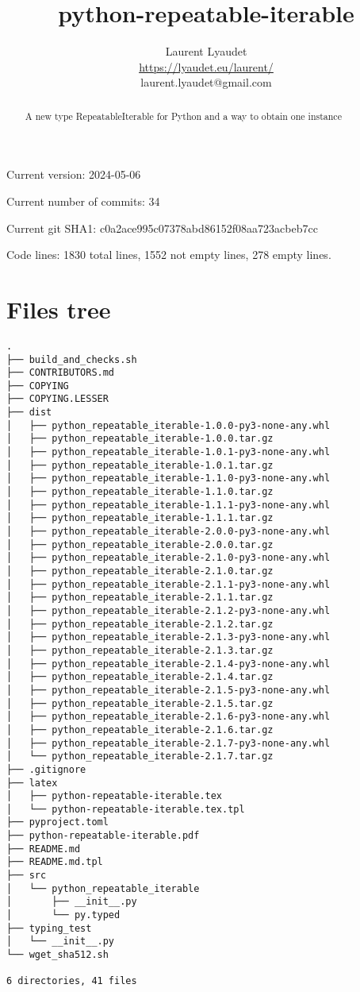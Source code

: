 \documentclass{article}
\begin{document}
\author{
  Laurent Lyaudet\\
  \url{https://lyaudet.eu/laurent/}\\
  laurent.lyaudet@gmail.com
}
\title{python-repeatable-iterable}

\maketitle
\begin{abstract}
A new type RepeatableIterable for Python
and a way to obtain one instance
\end{abstract}

Current version: 2024-05-06

Current number of commits: 34

Current git SHA1: c0a2ace995c07378abd86152f08aa723acbeb7cc

Code lines: 1830 total lines, 1552 not empty lines, 278 empty lines.

\section{Files tree}
\label{section:tree}

\begin{verbatim}
.
├── build_and_checks.sh
├── CONTRIBUTORS.md
├── COPYING
├── COPYING.LESSER
├── dist
│   ├── python_repeatable_iterable-1.0.0-py3-none-any.whl
│   ├── python_repeatable_iterable-1.0.0.tar.gz
│   ├── python_repeatable_iterable-1.0.1-py3-none-any.whl
│   ├── python_repeatable_iterable-1.0.1.tar.gz
│   ├── python_repeatable_iterable-1.1.0-py3-none-any.whl
│   ├── python_repeatable_iterable-1.1.0.tar.gz
│   ├── python_repeatable_iterable-1.1.1-py3-none-any.whl
│   ├── python_repeatable_iterable-1.1.1.tar.gz
│   ├── python_repeatable_iterable-2.0.0-py3-none-any.whl
│   ├── python_repeatable_iterable-2.0.0.tar.gz
│   ├── python_repeatable_iterable-2.1.0-py3-none-any.whl
│   ├── python_repeatable_iterable-2.1.0.tar.gz
│   ├── python_repeatable_iterable-2.1.1-py3-none-any.whl
│   ├── python_repeatable_iterable-2.1.1.tar.gz
│   ├── python_repeatable_iterable-2.1.2-py3-none-any.whl
│   ├── python_repeatable_iterable-2.1.2.tar.gz
│   ├── python_repeatable_iterable-2.1.3-py3-none-any.whl
│   ├── python_repeatable_iterable-2.1.3.tar.gz
│   ├── python_repeatable_iterable-2.1.4-py3-none-any.whl
│   ├── python_repeatable_iterable-2.1.4.tar.gz
│   ├── python_repeatable_iterable-2.1.5-py3-none-any.whl
│   ├── python_repeatable_iterable-2.1.5.tar.gz
│   ├── python_repeatable_iterable-2.1.6-py3-none-any.whl
│   ├── python_repeatable_iterable-2.1.6.tar.gz
│   ├── python_repeatable_iterable-2.1.7-py3-none-any.whl
│   └── python_repeatable_iterable-2.1.7.tar.gz
├── .gitignore
├── latex
│   ├── python-repeatable-iterable.tex
│   └── python-repeatable-iterable.tex.tpl
├── pyproject.toml
├── python-repeatable-iterable.pdf
├── README.md
├── README.md.tpl
├── src
│   └── python_repeatable_iterable
│       ├── __init__.py
│       └── py.typed
├── typing_test
│   └── __init__.py
└── wget_sha512.sh

6 directories, 41 files
\end{verbatim}
\end{document}
